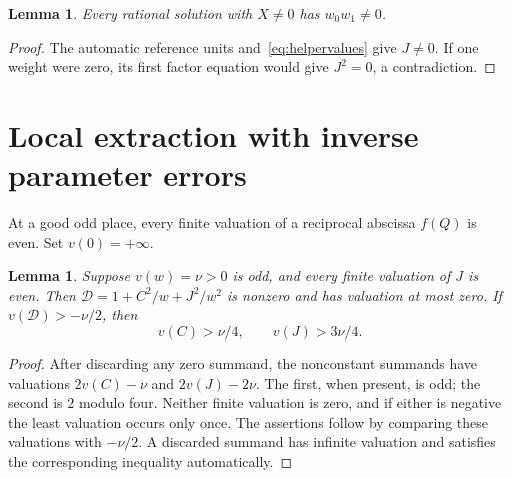 \documentclass[11pt,a4paper]{article}
\newtheorem{lemma}[theorem]{Lemma}
\begin{document}
\begin{lemma}\label{lem:nonzero}
Every rational solution with $X\ne0$ has $w_0w_1\ne0$.
\end{lemma}
\begin{proof}
The automatic reference units and~\eqref{eq:helpervalues} give $J\ne0$.
If one weight were zero, its first factor equation would give
$J^2=0$, a contradiction.
\end{proof}

\section{Local extraction with inverse parameter errors}
At a good odd place, every finite valuation of a reciprocal abscissa
$f(Q)$ is even. Set $v(0)=+\infty$.

\begin{lemma}\label{lem:factor}
Suppose $v(w)=\nu>0$ is odd, and every finite valuation of $J$ is
even. Then $\mathcal D=1+C^2/w+J^2/w^2$ is nonzero and has
valuation at most zero. If $v(\mathcal D)>-\nu/2$, then
\[
                         v(C)>\nu/4,\qquad v(J)>3\nu/4.
\]
\end{lemma}
\begin{proof}
After discarding any zero summand, the nonconstant summands have
valuations $2v(C)-\nu$ and $2v(J)-2\nu$. The first, when present,
is odd; the second is $2$ modulo four. Neither finite valuation
is zero, and if either is negative the least valuation occurs
only once. The assertions follow by comparing these valuations
with $-\nu/2$. A discarded summand has infinite valuation and
satisfies the corresponding inequality automatically.
\end{proof}
\end{document}
